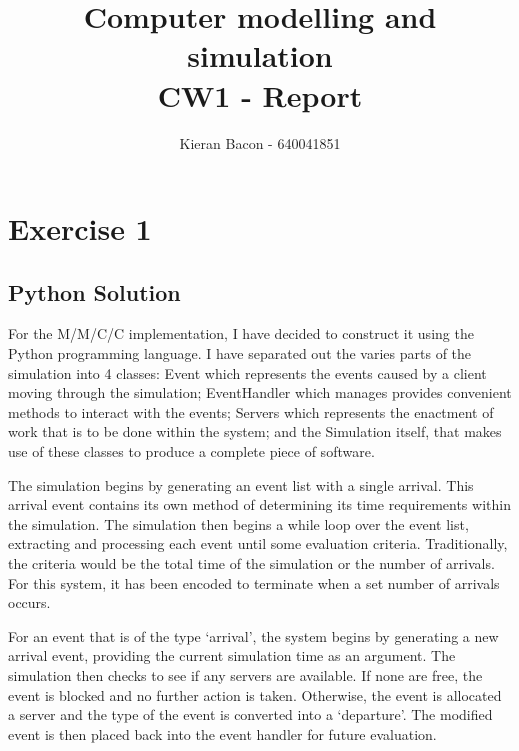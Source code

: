 \documentclass{ecmm427_assignment}
\begin{document}
\title{Computer modelling and simulation\\ CW1 - Report}
\author{Kieran Bacon - 640041851}
\maketitle
\thispagestyle{empty}

\declaration
\newpage %

\tableofcontents
\thispagestyle{empty}

\newpage
{}

\section{Exercise 1}

\subsection{Python Solution}

For the M/M/C/C implementation, I have decided to construct it using the Python programming language. I have separated out the varies parts of the simulation into 4 classes: Event which represents the events caused by a client moving through the simulation; EventHandler which manages provides convenient methods to interact with the events; Servers which represents the enactment of work that is to be done within the system; and the Simulation itself, that makes use of these classes to produce a complete piece of software.

The simulation begins by generating an event list with a single arrival. This arrival event contains its own method of determining its time requirements within the simulation. The simulation then begins a while loop over the event list, extracting and processing each event until some evaluation criteria. Traditionally, the criteria would be the total time of the simulation or the number of arrivals. For this system, it has been encoded to terminate when a set number of arrivals occurs.

For an event that is of the type `arrival', the system begins by generating a new arrival event, providing the current simulation time as an argument. The simulation then checks to see if any servers are available. If none are free, the event is blocked and no further action is taken. Otherwise, the event is allocated a server and the type of the event is converted into a `departure'. The modified event is then placed back into the event handler for future evaluation.
\end{document}
